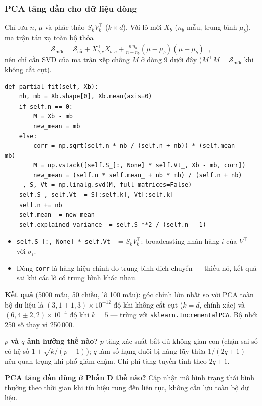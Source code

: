 \documentclass[11pt,a4paper]{article}
\newcommand{\code}[1]{\texttt{#1}}
\begin{document}
\subsubsection*{PCA tăng dần cho dữ liệu dòng}
Chỉ lưu $n$, $\mu$ và phác thảo $S_kV_k^\top$ ($k\times d$). Với lô mới $X_b$ ($n_b$ mẫu, trung bình $\mu_b$), ma trận tán xạ toàn bộ thỏa
\[\mathcal S_{\text{mới}}=\mathcal S_{\text{cũ}}+X_{b,c}^\top X_{b,c}+\tfrac{n\,n_b}{n+n_b}(\mu-\mu_b)(\mu-\mu_b)^\top,\]
nên chỉ cần SVD của ma trận xếp chồng $M$ ở dòng 9 dưới đây ($M^\top M=\mathcal S_{\text{mới}}$ khi không cắt cụt).
\begin{verbatim}
def partial_fit(self, Xb):
    nb, mb = Xb.shape[0], Xb.mean(axis=0)
    if self.n == 0:
        M = Xb - mb
        new_mean = mb
    else:
        corr = np.sqrt(self.n * nb / (self.n + nb)) * (self.mean_ - mb)
        M = np.vstack([self.S_[:, None] * self.Vt_, Xb - mb, corr])
        new_mean = (self.n * self.mean_ + nb * mb) / (self.n + nb)
    _, S, Vt = np.linalg.svd(M, full_matrices=False)
    self.S_, self.Vt_ = S[:self.k], Vt[:self.k]
    self.n += nb
    self.mean_ = new_mean
    self.explained_variance_ = self.S_**2 / (self.n - 1)
\end{verbatim}
\begin{itemize}
\item \code{self.S\_[:, None] * self.Vt\_} $=S_kV_k^\top$: broadcasting nhân hàng $i$ của $V^\top$ với $\sigma_i$.
\item Dòng \code{corr} là hàng hiệu chỉnh do trung bình dịch chuyển — thiếu nó, kết quả sai khi các lô có trung bình khác nhau.
\end{itemize}
\textbf{Kết quả} (5000 mẫu, 50 chiều, lô 100 mẫu): góc chính lớn nhất so với PCA toàn bộ dữ liệu là $(3{,}1\pm1{,}3)\times10^{-12}$ độ khi không cắt cụt ($k=d$, chính xác) và $(6{,}4\pm2{,}2)\times10^{-4}$ độ khi $k=5$ — trùng với \code{sklearn.IncrementalPCA}. Bộ nhớ: 250 số thay vì 250\,000.

\begin{ask}
\textbf{$p$ và $q$ ảnh hưởng thế nào?} $p$ tăng xác suất bắt đủ không gian con (chặn sai số có hệ số $1+\sqrt{k/(p-1)}$); $q$ làm số hạng đuôi bị nâng lũy thừa $1/(2q+1)$ nên quan trọng khi phổ giảm chậm. Chi phí tăng tuyến tính theo $2q+1$.

\textbf{PCA tăng dần dùng ở Phần D thế nào?} Cập nhật mô hình trạng thái bình thường theo thời gian khi tín hiệu rung đến liên tục, không cần lưu toàn bộ dữ liệu.
\end{ask}
\end{document}
